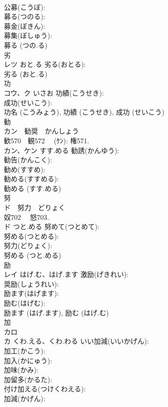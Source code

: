 \documentclass[8pt]{extreport}
\begin{document}
\begin{CJK}{UTF8}{min}
\\	公募(こうぼ): 
\\	募る(つのる): 
\\	募金(ぼきん): 
\\	募集(ぼしゅう): 
\\	募る (つの.る)
\\	劣			
\\	レツ	おと.る	劣る(おとる): 
\\	劣る (おと.る)
\\	功			
\\	コウ、ク	いさお	功績(こうせき): 
\\	成功(せいこう): 
\\	功名 (こうみょう), 功績 (こうせき), 成功 (せいこう)
\\	勧			
\\	カン　勧奨　かんしょう
\\	歓570　観572 　(ｹﾝ): 権571.	
\\	カン、ケン	すす.める	勧誘(かんゆう): 
\\	勧告(かんこく): 
\\	勧め(すすめ): 
\\	勧める(すすめる): 
\\	勧める (すす.める)
\\	努			
\\	ド　努力　どりょく 
\\	奴702 　怒703.	
\\	ド	つと.める	努めて(つとめて): 
\\	努める(つとめる): 
\\	努力(どりょく): 
\\	努める (つと.める)
\\	励			
\\	レイ	はげ.む、はげ.ます	激励(げきれい): 
\\	奨励(しょうれい): 
\\	励ます(はげます): 
\\	励む(はげむ): 
\\	励ます (はげ.ます), 励む (はげ.む)
\\	加			
\\	カロ
\\	カ	くわ.える、くわ.わる	いい加減(いいかげん): 
\\	加工(かこう): 
\\	加入(かにゅう): 
\\	加味(かみ): 
\\	加留多(かるた): 
\\	付け加える(つけくわえる): 
\\	加減(かげん): 

\end{CJK}
\end{document}
